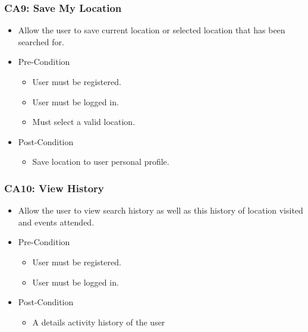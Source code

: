 \documentclass[12pt,a4paper]{article}
\begin{document}
		\subsubsection{CA9: Save My Location}
			\begin{itemize}
				\item Allow the user to save current location or selected location that has been searched for.
				\item Pre-Condition
					\begin{itemize}
						\item User must be registered.
						\item User must be logged in.
						\item Must select a valid location.
					\end{itemize}
				\item Post-Condition
					\begin{itemize}
						\item Save location to user personal profile.
					\end{itemize}
			\end{itemize}
		\subsubsection{CA10: View History}
			\begin{itemize}
				\item Allow the user to view search history as well as this history of location visited and events attended.
				\item Pre-Condition
					\begin{itemize}
						\item User must be registered.
						\item User must be logged in.
					\end{itemize}
				\item Post-Condition
					\begin{itemize}
						\item A details activity history of the user
					\end{itemize}
			\end{itemize}
\end{document}
